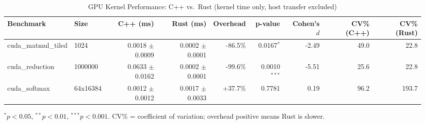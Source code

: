 \begin{table}[htbp]
\caption{GPU Kernel Performance: C++ vs.\ Rust (kernel time only, host transfer excluded)}
\label{tab:gpu_results}
\centering
\begin{tabular}{llrrrrrrr}
\toprule
Benchmark & Size & C++ (ms) & Rust (ms) & Overhead & p-value & Cohen's $d$ & CV\% (C++) & CV\% (Rust) \\
\midrule
cuda\_matmul\_tiled & 1024 & 0.0018 $\pm$ 0.0009 & 0.0002 $\pm$ 0.0001 & -86.5\% & 0.0167$^{*}$ & -2.49 & 49.0 & 22.8 \\
cuda\_reduction & 1000000 & 0.0633 $\pm$ 0.0162 & 0.0002 $\pm$ 0.0001 & -99.6\% & 0.0010$^{***}$ & -5.51 & 25.6 & 22.8 \\
cuda\_softmax & 64x16384 & 0.0012 $\pm$ 0.0012 & 0.0017 $\pm$ 0.0033 & +37.7\% & 0.7781 & 0.19 & 96.2 & 193.7 \\
\bottomrule
\end{tabular}
\smallskip
{\small $^{*}p<0.05$, $^{**}p<0.01$, $^{***}p<0.001$. CV\% = coefficient of variation; overhead positive means Rust is slower.}
\end{table}

